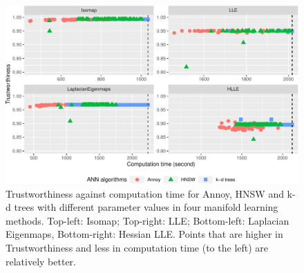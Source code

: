 \documentclass[12pt]{article}
\begin{document}
\begin{figure}

{\centering \includegraphics[width=1\linewidth]{mlann_jcgs_files/figure-latex/iso-1} 

}

\caption{Trustworthiness against computation time for Annoy, HNSW and k-d trees with different parameter values in four manifold learning methods. Top-left: Isomap; Top-right: LLE; Bottom-left: Laplacian Eigenmaps, Bottom-right: Hessian LLE. Points that are higher in Trustworthiness and less in computation time (to the left) are relatively better. }\label{fig:iso}
\end{figure}
\end{document}
